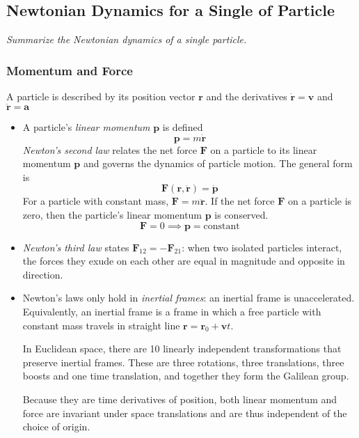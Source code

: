 \documentclass[11pt, a4paper]{article}
\newcommand{\bdot}[1]{\dot{\bm{#1}}}
\newcommand{\bddot}[1]{\ddot{\bm{#1}}}
\begin{document}
\subsection{Newtonian Dynamics for a Single of Particle}
\textit{Summarize the Newtonian dynamics of a single particle.}

\subsubsection{Momentum and Force}
A particle is described by its position vector $ \bm{r} $ and the derivatives $ \bdot{r} = \bm{v}$ and $ \bddot{r} = \bm{a}$
\begin{itemize}
	\item A particle's \textit{linear momentum} $ \bm{p} $ is defined
	\begin{equation*}
		\bm{p} = m \bdot{r}
	\end{equation*}
	\textit{Newton's second law} relates the net force $ \bm{F} $ on a particle to its linear momentum $ \bm{p} $ and governs the dynamics of particle motion. The general form is
	\begin{equation*}
		\bm{F}(\bm{r}, \dot{\bm{r}}) = \bdot{p}
	\end{equation*}
	For a particle with constant mass, $ \bm{F} = m \ddot{\bm{r}} $. If the net force $ \bm{F} $ on a particle is zero, then the particle's linear momentum $ \bm{p} $ is conserved. 
	\begin{equation*}
		\bm{F} = 0 \implies \bm{p} = \text{constant} 
	\end{equation*}
	
	\item \textit{Newton's third law} states $ \bm{F}_{12} = - \bm{F}_{21} $: when two isolated particles interact, the forces they exude on each other are equal in magnitude and opposite in direction.
	
	\item Newton's laws only hold in \textit{inertial frames}: an inertial frame is unaccelerated. Equivalently, an inertial frame is a frame in which a free particle with constant mass travels in straight line $ \bm{r} = \bm{r}_0 + \bm{v}t $.
		
	In Euclidean space, there are 10 linearly independent transformations that preserve inertial frames. These are three rotations, three translations, three boosts and one time translation, and together they form the Galilean group.
	
	Because they are time derivatives of position, both linear momentum and force are invariant under space translations and are thus independent of the choice of origin.
	

\end{itemize}
\end{document}
